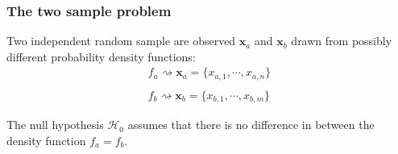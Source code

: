 \frame
{
\frametitle{The two sample problem}

Two independent random sample are observed $\mathbf{x}_{a}$ and $\mathbf{x}_{b}$ drawn from possibly different probability density functions:
$$
\begin{array}{l}
 f_{a}  \rightsquigarrow \mathbf{x}_a=\lbrace x_{a,1},\cdots, x_{a,n} \rbrace\\
\\
f_{b}  \rightsquigarrow \mathbf{x}_b=\lbrace x_{b,1},\cdots, x_{b,m} \rbrace
\end{array}
$$
\begin{definition}
The \alert{null hypothesis $\mathcal{H}_0$} assumes that there is no difference in between the density function $f_a=f_b$.
\end{definition}

}


